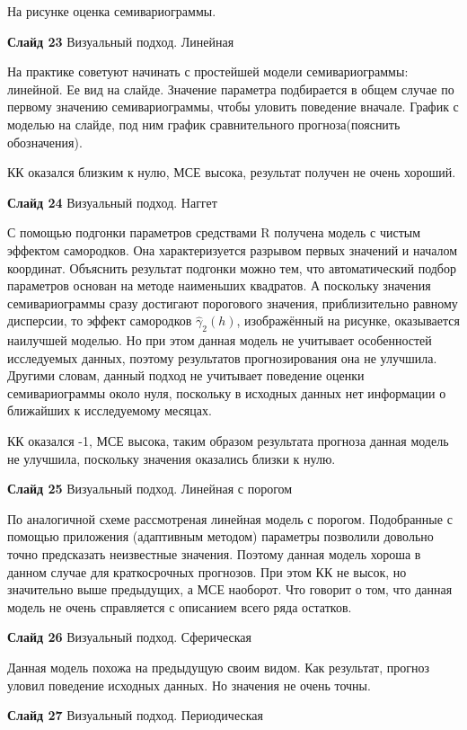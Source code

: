 \documentclass[a4paper,10pt]{report}
\begin{document}
На рисунке оценка семивариограммы.

\textbf{Слайд 23} Визуальный подход. Линейная

На практике советуют начинать с простейшей модели семивариограммы: линейной. Ее вид на слайде. Значение параметра подбирается в общем случае по первому значению семивариограммы, чтобы уловить поведение вначале. График с моделью на слайде, под ним график сравнительного прогноза(пояснить обозначения).

КК оказался близким к нулю, МСЕ высока, результат получен не очень хороший.

\textbf{Слайд 24} Визуальный подход. Наггет

С помощью подгонки параметров средствами R получена модель с чистым эффектом самородков. Она характеризуется разрывом первых значений и началом координат. Объяснить результат подгонки можно тем, что автоматический подбор параметров основан на методе наименьших квадратов. А поскольку значения семивариограммы сразу достигают порогового значения, приблизительно равному дисперсии, то эффект самородков $ \widehat{\gamma}_2(h) $, изображённый на рисунке, оказывается наилучшей моделью. Но при этом данная модель не учитывает особенностей исследуемых данных, поэтому результатов прогнозирования она не улучшила. Другими словам, данный подход не учитывает поведение оценки семивариограммы около нуля, поскольку в исходных данных нет информации о ближайших к исследуемому месяцах.

КК оказался -1, МСЕ высока, таким образом результата прогноза данная модель не улучшила, поскольку значения оказались близки к нулю.

\textbf{Слайд 25} Визуальный подход. Линейная с порогом

По аналогичной схеме рассмотреная линейная модель с порогом. Подобранные с помощью приложения (адаптивным методом) параметры позволили довольно точно предсказать неизвестные значения. Поэтому данная модель хороша в данном случае для краткосрочных прогнозов. При этом КК не высок, но значительно выше предыдущих, а МСЕ наоборот. Что говорит о том, что данная модель не очень справляется с описанием всего ряда остатков.

\textbf{Слайд 26} Визуальный подход. Сферическая

Данная модель похожа на предыдущую своим видом. Как результат, прогноз уловил поведение исходных данных. Но значения не очень точны.

\textbf{Слайд 27} Визуальный подход. Периодическая
\end{document}
